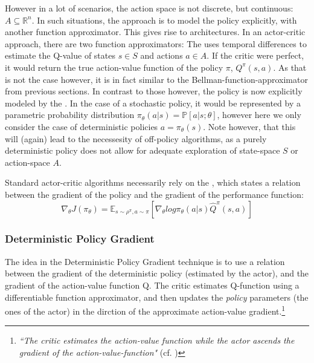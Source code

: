 \noindent However in a lot of scenarios, the action space is not discrete, but continuous: \mbox{$A \subseteq \mathds{R}^n$}. In such situations, the approach is to model the policy explicitly, with another function approximator. This gives rise to  architectures. In an actor-critic approach, there are two function approximators: The  uses temporal differences to estimate the Q-value of states $s \in S$ and actions $a \in A$. If the critic were perfect, it would return the true action-value function of the policy $\pi$, $Q^\pi(s,a)$. As that is not the case however, it is in fact similar to the Bellman-function-approximator from previous sections. In contrast to those however, the policy is now explicitly modeled by the . In the case of a stochastic policy, it would be represented by a parametric probability distribution $\pi_\theta(a|s) = \mathds{P}[a|s;\theta]$, however here we only consider the case of deterministic policies $a = \pi_\theta(s)$. Note however, that this will (again) lead to the necessesity of off-policy algorithms, as a purely deterministic policy does not allow for adequate exploration of state-space $S$ or action-space $A$.

Standard actor-critic algorithms necessarily rely on the , which states a relation between the gradient of the policy and the gradient of the performance function:
\begin{equation}
	\nabla_{\theta}J(\pi_\theta) = \mathds{E}_{s\sim\rho^\pi,a\sim\pi}[\nabla_\theta log \pi_\theta(a|s)\hat{Q}^\pi(s,a)]
\end{equation} %

\subsubsection{Deterministic Policy Gradient}

The idea in the Deterministic Policy Gradient technique is to use a relation between the gradient of the deterministic policy (estimated by the actor), and the gradient of the action-value function Q. The critic estimates Q-function using a differentiable function approximator, and then updates the \textit{policy} parameters (the ones of the actor) in the dirction of the approximate action-value gradient.\footnote{\textit{``The critic estimates the action-value function while the actor ascends the gradient of the action-value-function"} (cf. \cite{silver_deterministic_2014})}

